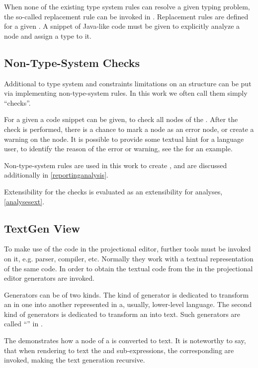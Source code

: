 When none of the existing type system rules can resolve a given typing problem, the so-called replacement
rule can be invoked in \jbmps. Replacement rules are defined for a given . A snippet of Java-like
code must be given to explicitly analyze a node and assign a type to it.


\subsection{Non-Type-System Checks}
\label{mpsnontschecks}

Additional to type system and constraints limitations on an  structure can be put via implementing 
non-type-system rules. In this work we often call them simply ``checks''.

For a given  a code snippet can be given, to check all nodes of the . After the 
check is performed, there is a chance to mark a node as an error node, or create a warning on the node.
It is possible to provide some textual hint for a language user, to identify the reason of the error or warning, 
see the  for an example.

Non-type-system rules are used in this work to create , and are discussed additionally in \ref{reportinganalysis}.

Extensibility for the checks is evaluated as an extensibility for analyses, \ref{analysesext}.

\subsection{TextGen View}

To make use of the code in the projectional editor, further tools must be invoked on it, e.g. parser, compiler, etc.
Normally they work with a textual representation of the same code. In order to obtain the textual code from the  in the projectional
editor generators are invoked. 

Generators can be of two kinds. The kind of generator is dedicated to transform an  in one  into
another  represented in a, usually, lower-level language. The second kind of generators is dedicated to transform an  into text.
Such generators are called ``'' in \jbmps.


The  demonstrates how a node of a   is converted to text. It is noteworthy 
to say, that when rendering to text the  and  sub-expressions, the corresponding  are invoked,
making the text generation recursive.


